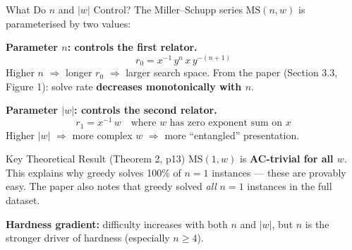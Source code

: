 \documentclass[aspectratio=169,11pt]{beamer}
\newcommand{\inv}[1]{#1^{-1}}
\begin{document}
\begin{frame}{What Do $n$ and $|w|$ Control?}
  \small
  The Miller--Schupp series $\mathrm{MS}(n, w)$ is parameterised by two values:

  \medskip
  \textbf{Parameter $n$: controls the first relator.}
  \[
    r_0 = \inv{x}\, y^n\, x\, y^{-(n+1)}
  \]
  Higher $n$ $\Rightarrow$ longer $r_0$ $\Rightarrow$ larger search space.
  From the paper (Section 3.3, Figure 1): solve rate \textbf{decreases monotonically with $n$}.

  \medskip
  \textbf{Parameter $|w|$: controls the second relator.}
  \[
    r_1 = \inv{x}\, w \quad\text{where } w \text{ has zero exponent sum on } x
  \]
  Higher $|w|$ $\Rightarrow$ more complex $w$ $\Rightarrow$ more ``entangled'' presentation.

  \medskip
  \begin{block}{Key Theoretical Result (Theorem 2, p13)}
    $\mathrm{MS}(1, w)$ is \textbf{AC-trivial for all $w$}.
    This explains why greedy solves 100\% of $n{=}1$ instances --- these are provably easy.
    The paper also notes that greedy solved \emph{all} $n{=}1$ instances in the full dataset.
  \end{block}

  \medskip
  \textbf{Hardness gradient:} difficulty increases with both $n$ and $|w|$, but $n$
  is the stronger driver of hardness (especially $n \ge 4$).
\end{frame}
\end{document}

